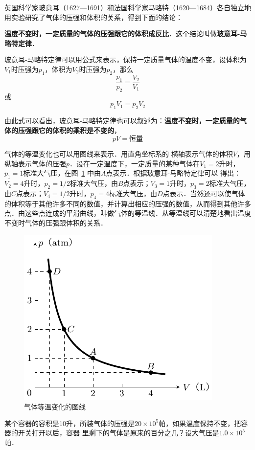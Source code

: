 英国科学家玻意耳（1627—1691）和法国科学家马略特（1620—1684）各自独立地用实验研究了气体的压强和体积的关系，得到下面的结论：

\textbf{温度不变时，一定质量的气体的压强跟它的体积成反比}．这个结论叫做\textbf{玻意耳-马略特定律}．

玻意耳-马略特定律可以用公式来表示，保持一定质量气体的温度不变，设体积为$V_1$时压强为$p_1$，体积为$V_2$时压强为$p_2$，那么
\[\frac{p_1}{p_2}=\frac{V_2}{V_1} \]
或
\[p_1V_1=p_2V_2 \]

由此式可以看出，玻意耳-马略特定律也可以叙述为：\textbf{温度不变时，一定质量的气体的压强跟它的体积的乘积是不变的}，
\[pV=\text{恒量}\]

气体的等温变化也可以用图线来表示．用直角坐标系的
横轴表示气体的体积$V$，用纵轴表示气体的压强$p$．设在一定温度下，一定质量的某种气体在$V_1=2$升时，$p_1=1$标准大气压，在图~\ref{fig_B_3-6} 中由$A$点表示．根据玻意耳-马略特定律可以
得出：$V_2=4$升时，$p_2=1/2$标准大气压，由$B$点表示；$V_3=1$升时，$p_3=2$标准大气压，由$C$点表示；$V_4=1/2$升时，$p_4=4$标准大气压，由$D$点表示．当然还可以使气体的体积等于其他许多不同的数值，并计算出相应的压强的数值，从而得到其他许多点．由这些点连成的平滑曲线，叫做气体的等温线．从等温线可以清楚地看出温度不变时气体的压强跟体积的关系．
\begin{figure}[htbp]
    \centering
    \includegraphics{fig/B/3-6.pdf}
    \caption{气体等温变化的图线}\label{fig_B_3-6}
\end{figure}

\begin{example}
某个容器的容积是10升，所装气体的压强是$20\times 10^5$帕，如果温度保持不变，把容器的开关打开以后，容器
里剩下的气体是原来的百分之几？设大气压是$1.0\times 10^5$帕．
\end{example}

